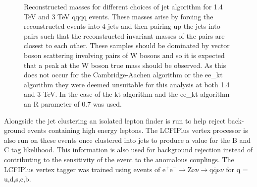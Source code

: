 \begin{figure}
\centering
{}
\caption[Reconstructed invariant masses for different choices of jet algorithm for 1.4 TeV and 3 TeV \nu{\nu}qqqq events.]{Reconstructed masses for different choices of jet algorithm for 1.4 TeV and 3 TeV \nu{\nu}qqqq events. These masses arise by forcing the reconstructed events into 4 jets and then pairing up the jets into pairs such that the reconstructed invariant masses of the pairs are closest to each other. These samples should be dominated by vector boson scattering involving pairs of W bosons and so it is expected that a peak at the W boson true mass should be observed. As this does not occur for the Cambridge-Aachen algorithm or the ee\_kt algorithm they were deemed unsuitable for this analysis at both 1.4 and 3 TeV. In the case of the kt algorithm and the ee\_kt algorithm an R parameter of 0.7 was used.}
\label{fig:eventweights}
\end{figure}

Alongside the jet clustering an isolated lepton finder is run to help reject back- ground events containing high energy leptons. The LCFIPlus vertex processor is also run on these events once clustered into jets to produce a value for the B and C tag likelihood. This information is also used for background rejection instead of contributing to the sensitivity of the event to the anomalous couplings. The LCFIPlus vertex tagger was trained using events of $\text{e}^{+}\text{e}^{-}\rightarrow \text{Z}\nu\nu \rightarrow \text{q}\bar{\text{q}}\nu\nu$ for q = u,d,s,c,b.

